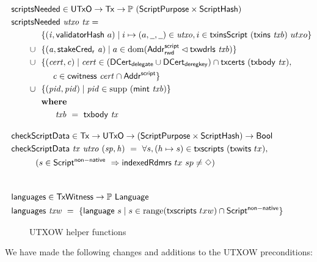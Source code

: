 \begin{figure}[htb]
  \begin{align*}
    & \hspace{-1cm}\fun{scriptsNeeded} \in \UTxO \to \Tx \to \powerset (\ScriptPurpose \times \ScriptHash) \\
    & \hspace{-1cm}\fun{scriptsNeeded}~\var{utxo}~\var{tx} = \\
    & ~~\{ (\var{i}, \fun{validatorHash}~a) \mid i \mapsto (a, \wcard, \wcard) \in \var{utxo},
      i\in\fun{txinsScript}~{(\fun{txins~\var{txb}})}~{utxo}\} \\
    \cup & ~~\{ (\var{a}, \fun{stakeCred_{r}}~\var{a}) \mid a \in \dom (\AddrRWDScr
           \restrictdom \fun{txwdrls}~\var{txb}) \} \\
    \cup & ~~\{ (\var{cert}, \var{c}) \mid \var{cert} \in (\DCertDeleg \cup \DCertDeRegKey)\cap\fun{txcerts}~(\txbody{tx}), \\
    & ~~~~~~\var{c} \in \cwitness{cert} \cap \AddrScr\} \\
      \cup & ~~\{ (\var{pid}, \var{pid}) \mid \var{pid} \in \supp~(\fun{mint}~\var{txb}) \} \\
    & \where \\
    & ~~~~~~~ \var{txb}~=~\txbody{tx}
    \nextdef
    & \hspace{-1cm}\fun{checkScriptData} \in \Tx \to \UTxO \to (\ScriptPurpose \times \ScriptHash) \to \Bool \\
    & \hspace{-1cm}\fun{checkScriptData}~\var{tx}~\var{utxo}~(\var{sp},\var{h})~=~ \forall s, (h\mapsto s) \in \fun{txscripts}~(\fun{txwits}~tx),\\
    & (s \in \ScriptNonNative~\Rightarrow \fun{indexedRdmrs}~tx~sp \neq \Nothing) \\
    \nextdef
    & \hspace{-1cm}\fun{languages} \in \TxWitness \to \powerset{\Language} \\
    & \hspace{-1cm}\fun{languages}~\var{txw}~=~
      \{\fun{language}~s \mid s \in \range (\fun{txscripts}~{txw}) \cap \ScriptNonNative\}
  \end{align*}
  \caption{UTXOW helper functions}
  \label{fig:functions-witnesses}
\end{figure}

We have made the following changes and additions to the UTXOW preconditions:

